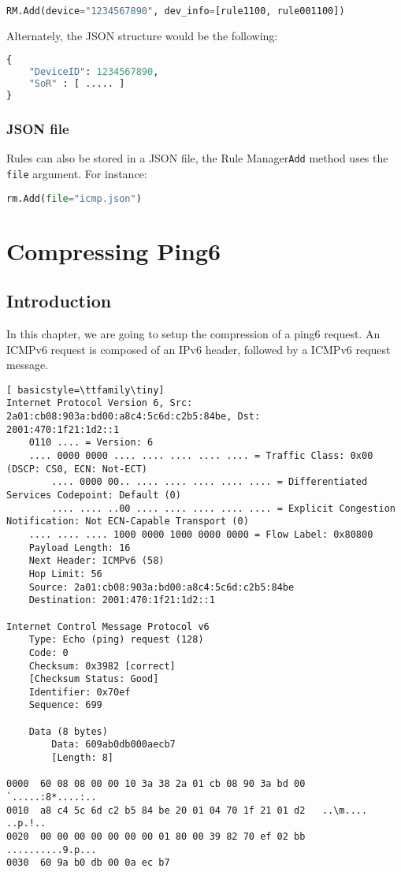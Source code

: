 \documentclass[onecolumn,12pt]{book}
\newcounter{c}
\begin{document}
\begin{lstlisting}[language=Python]
RM.Add(device="1234567890", dev_info=[rule1100, rule001100])
\end{lstlisting}

Alternately, the JSON structure would be the following:

\begin{lstlisting}[language=Python]
{
    "DeviceID": 1234567890,
    "SoR" : [ ..... ]
}
\end{lstlisting}


\subsection{JSON file}

Rules can also be stored in a JSON file, the Rule Manager\texttt{Add} method uses the \texttt{file} argument. For instance:

\begin{lstlisting}[language=Python]
rm.Add(file="icmp.json")
\end{lstlisting}

\chapter{Compressing Ping6}

\section{Introduction}

In this chapter, we are going to setup the compression of a ping6 request. An ICMPv6 request is composed of an IPv6 header, followed by a ICMPv6 request message.

\begin{lstlisting}[ basicstyle=\ttfamily\tiny]
Internet Protocol Version 6, Src: 2a01:cb08:903a:bd00:a8c4:5c6d:c2b5:84be, Dst: 
2001:470:1f21:1d2::1
    0110 .... = Version: 6
    .... 0000 0000 .... .... .... .... .... = Traffic Class: 0x00 (DSCP: CS0, ECN: Not-ECT)
        .... 0000 00.. .... .... .... .... .... = Differentiated Services Codepoint: Default (0)
        .... .... ..00 .... .... .... .... .... = Explicit Congestion Notification: Not ECN-Capable Transport (0)
    .... .... .... 1000 0000 1000 0000 0000 = Flow Label: 0x80800
    Payload Length: 16
    Next Header: ICMPv6 (58)
    Hop Limit: 56
    Source: 2a01:cb08:903a:bd00:a8c4:5c6d:c2b5:84be
    Destination: 2001:470:1f21:1d2::1
    
Internet Control Message Protocol v6
    Type: Echo (ping) request (128)
    Code: 0
    Checksum: 0x3982 [correct]
    [Checksum Status: Good]
    Identifier: 0x70ef
    Sequence: 699

    Data (8 bytes)
        Data: 609ab0db000aecb7
        [Length: 8]

0000  60 08 08 00 00 10 3a 38 2a 01 cb 08 90 3a bd 00   `.....:8*....:..
0010  a8 c4 5c 6d c2 b5 84 be 20 01 04 70 1f 21 01 d2   ..\m.... ..p.!..
0020  00 00 00 00 00 00 00 01 80 00 39 82 70 ef 02 bb   ..........9.p...
0030  60 9a b0 db 00 0a ec b7  
\end{lstlisting}
\end{document}
